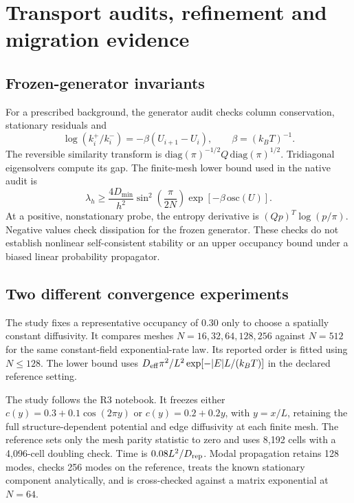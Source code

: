 \documentclass[11pt,a4paper]{article}
\newcommand{\code}[1]{\texttt{\detokenize{#1}}}
\begin{document}
\section{Transport audits, refinement and migration evidence}\label{sec:verification}

\subsection{Frozen-generator invariants}

For a prescribed background, the generator audit checks column conservation, stationary residuals and
\begin{equation}
 \log(k_i^+/k_i^-)=-\beta(U_{i+1}-U_i),\qquad\beta=(k_BT)^{-1}.
\end{equation}
The reversible similarity transform is
$\mathrm{diag}(\pi)^{-1/2}Q\,\mathrm{diag}(\pi)^{1/2}$.
Tridiagonal eigensolvers compute its gap. The finite-mesh lower bound used in the native audit is
\begin{equation}
 \lambda_h\geq\frac{4D_{\min}}{h^2}\sin^2\!\left(\frac{\pi}{2N}\right)
 \exp[-\beta\,\mathrm{osc}(U)].
\end{equation}
At a positive, nonstationary probe, the entropy derivative is $(Qp)^T\log(p/\pi)$. Negative values check dissipation for the frozen generator. These checks do not establish nonlinear self-consistent stability or an upper occupancy bound under a biased linear probability propagator.

\subsection{Two different convergence experiments}

The \code{continuum} study fixes a representative occupancy of 0.30 only to choose a spatially constant diffusivity. It compares meshes $N=16,32,64,128,256$ against $N=512$ for the same constant-field exponential-rate law. Its reported order is fitted using $N\leq128$. The lower bound uses $D_{\rm eff}\pi^2/L^2\exp[-|E|L/(k_BT)]$ in the declared reference setting.

The \code{refinement} study follows the R3 notebook. It freezes either $c(y)=0.3+0.1\cos(2\pi y)$ or $c(y)=0.2+0.2y$, with $y=x/L$, retaining the full structure-dependent potential and edge diffusivity at each finite mesh. The reference sets only the mesh parity statistic to zero and uses 8,192 cells with a 4,096-cell doubling check. Time is $0.08L^2/D_{\rm rep}$. Modal propagation retains 128 modes, checks 256 modes on the reference, treats the known stationary component analytically, and is cross-checked against a matrix exponential at $N=64$.
\end{document}
